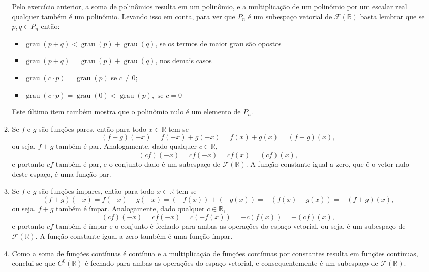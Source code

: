 \documentclass[12pt,a4paper]{article}
\newcommand*\R{\mathbb{R}}
\begin{document}
\begin{enumerate}
\begin{enumerate}
Pelo exercício anterior, a soma de polinômios resulta em um polinômio, e a multiplicação de um polinômio por um escalar real qualquer também é um polinômio. Levando isso em conta, para ver que $P_n$ é um subespaço vetorial de $\mathcal{F}(\R)$ basta lembrar que se $p, q \in P_n$ então:
\begin{itemize}
\item $\operatorname{grau}(p+q) < \operatorname{grau}(p) + \operatorname{grau}(q)$, se os termos de maior grau são opostos
\item $\operatorname{grau}(p+q) = \operatorname{grau}(p) + \operatorname{grau}(q)$, nos demais casos
\item $\operatorname{grau}(c \cdot p) = \operatorname{grau}(p)$ se $c \neq 0$;
\item $\operatorname{grau}(c \cdot p) = \operatorname{grau}(0) < \operatorname{grau}(p), \text{ se } c = 0$
\end{itemize}
Este último item também mostra que o polinômio nulo é um elemento de $P_n$.
\item Se $f$ e $g$ são funções pares, então para todo $x \in \R$ tem-se
\[
(f+g)(-x)
= f(-x) + g(-x)
= f(x) + g(x)
= (f + g)(x),
\]
ou seja, $f+g$ também é par. Analogamente, dado qualquer $c \in \R$,
\[
(cf)(-x)
= cf(-x)
= cf(x)
= (cf)(x),
\]
e portanto $cf$ também é par, e o conjunto dado é um subespaço de $\mathcal{F}(\R)$. A função constante igual a zero, que é o vetor nulo deste espaço, é uma função par.

\item Se $f$ e $g$ são funções ímpares, então para todo $x \in \R$ tem-se
\[
(f+g)(-x)
= f(-x) + g(-x)
= (-f(x)) + (-g(x))
= -(f(x) + g(x))
= -(f + g)(x),
\]
ou seja, $f+g$ também é ímpar. Analogamente, dado qualquer $c \in \R$,
\[
(cf)(-x)
= cf(-x)
= c(-f(x))
= -c(f(x))
= -(cf)(x),
\]
e portanto $cf$ também é ímpar e o conjunto é fechado para ambas as operações do espaço vetorial, ou seja, é um subespaço de $\mathcal{F}(\R)$. A função constante igual a zero também é uma função ímpar.

\item Como a soma de funções contínuas é contínua e a multiplicação de funções contínuas por constantes resulta em funções contínuas, conclui-se que $C^0(\R)$ é fechado para ambas as operações do espaço vetorial, e consequentemente é um subespaço de $\mathcal{F}(\R)$.


\end{enumerate}
\end{enumerate}
\end{document}
